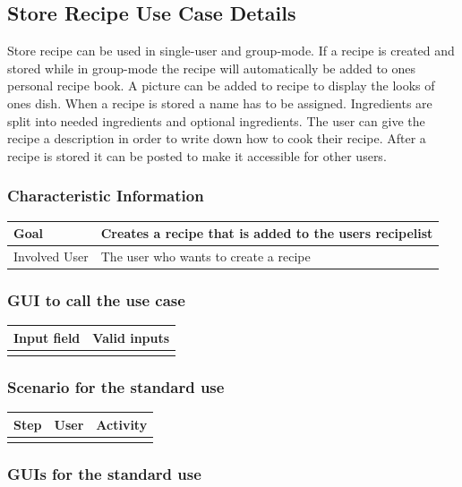 \documentclass[12pt]{article}
\theoremstyle{definition}
\begin{document}
\subsection{Store Recipe Use Case Details}

Store recipe can be used in single-user and group-mode. If a recipe is created and stored while in group-mode the recipe will automatically be added to ones personal recipe book. A picture can be added to recipe to display the looks of ones dish. When a recipe is stored a name has to be assigned. Ingredients are split into needed ingredients and optional ingredients. The user can give the recipe a description in order to write down how to cook their recipe. After a recipe is stored it can be posted to make it accessible for other users.

\subsubsection{Characteristic Information}

\begin{tabular}{|l|l|}
\hline
Goal & Creates a recipe that is added to the users recipelist  \\ \hline
Involved User & The user who wants to create a recipe \\ \hline
\end{tabular}

\subsubsection{GUI to call the use case}

\begin{tabular}{|l|l|}
\hline
Input field & Valid inputs \\ \hline
 &  \\ \hline
\end{tabular}

\subsubsection{Scenario for the standard use}

\begin{tabular}{|l|l|l|}
\hline
Step & User & Activity \\ \hline
 & & \\ \hline
\end{tabular}

\subsubsection{GUIs for the standard use}
\end{document}
